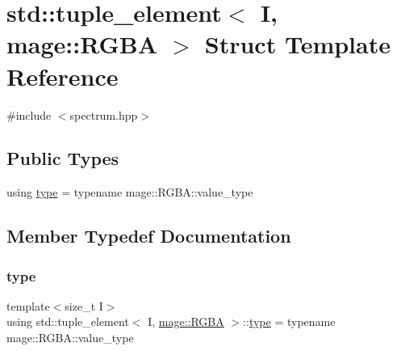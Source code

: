 \hypertarget{structstd_1_1tuple__element_3_01_i_00_01mage_1_1_r_g_b_a_01_4}{}\section{std\+:\+:tuple\+\_\+element$<$ I, mage\+:\+:R\+G\+BA $>$ Struct Template Reference}
\label{structstd_1_1tuple__element_3_01_i_00_01mage_1_1_r_g_b_a_01_4}


{\ttfamily \#include $<$spectrum.\+hpp$>$}

\subsection*{Public Types}
\begin{DoxyCompactItemize}
\item 
using \mbox{\hyperlink{structstd_1_1tuple__element_3_01_i_00_01mage_1_1_r_g_b_a_01_4_a22c2f400377cb726291cbecbf22151e4}{type}} = typename mage\+::\+R\+G\+B\+A\+::value\+\_\+type
\end{DoxyCompactItemize}


\subsection{Member Typedef Documentation}
\mbox{\label{structstd_1_1tuple__element_3_01_i_00_01mage_1_1_r_g_b_a_01_4_a22c2f400377cb726291cbecbf22151e4}} 
\subsubsection{\texorpdfstring{type}{type}}
{\footnotesize\ttfamily template$<$size\+\_\+t I$>$ \\
using std\+::tuple\+\_\+element$<$ I, \mbox{\hyperlink{structmage_1_1_r_g_b_a}{mage\+::\+R\+G\+BA}} $>$\+::\mbox{\hyperlink{structstd_1_1tuple__element_3_01_i_00_01mage_1_1_r_g_b_a_01_4_a22c2f400377cb726291cbecbf22151e4}{type}} =  typename mage\+::\+R\+G\+B\+A\+::value\+\_\+type}

